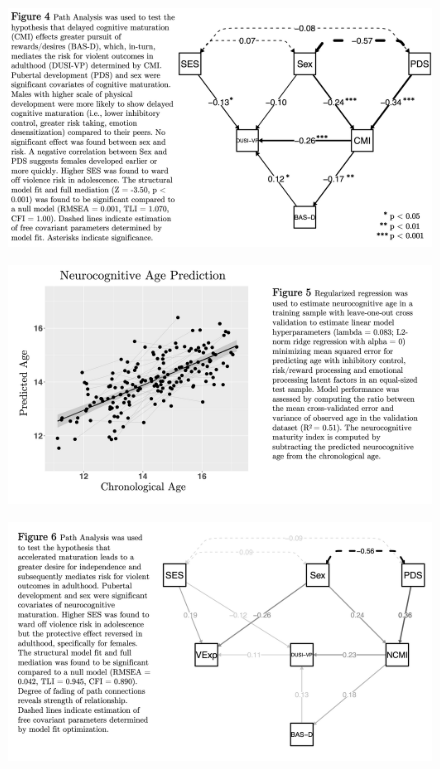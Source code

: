 \documentclass[utf8]{frontiersSCNS} %
\begin{document}
\begin{figure}[h!]
\includegraphics[width=\textwidth,height=\textheight,keepaspectratio]{Fig-4}
\label{fig:4}
\end{figure}

\begin{figure}[h!]
\includegraphics[width=\textwidth,height=\textheight,keepaspectratio]{Fig-5}
\label{fig:5}
\end{figure}

\begin{figure}[h!]
\includegraphics[width=\textwidth,height=\textheight,keepaspectratio]{Fig-6}
\label{fig:6}
\end{figure}
\end{document}
